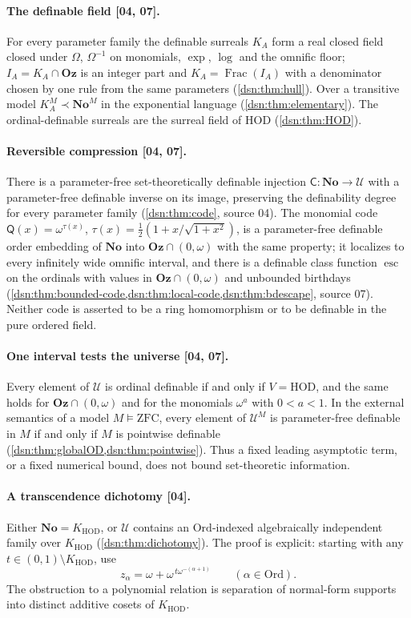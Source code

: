 \documentclass[11pt,a4paper]{article}
\numberwithin{equation}{section}
\theoremstyle{definition}
\theoremstyle{remark}
\newcommand{\No}{\mathbf{No}}
\newcommand{\Oz}{\mathbf{Oz}}
\newcommand{\Ord}{\mathrm{Ord}}
\newcommand{\HOD}{\mathrm{HOD}}
\newcommand{\ZFC}{\mathrm{ZFC}}
\newcommand{\Frac}{\operatorname{Frac}}
\newcommand{\Code}{\mathsf C}
\newcommand{\Mc}{\mathsf Q}
\newcommand{\esc}{\operatorname{esc}}
\newcommand{\Cell}{\mathcal U}
\newcommand{\KH}{K_{\HOD}}
\newcommand{\src}[1]{\textup{\textsf{\small[#1]}}}
\begin{document}
\paragraph{The definable field \src{04, 07}.}
For every parameter family the definable surreals $K_A$ form a real closed
field closed under $\Omega$, $\Omega^{-1}$ on monomials, $\exp$, $\log$
and the omnific floor; $I_A=K_A\cap\Oz$ is an integer part and
$K_A=\Frac(I_A)$ with a denominator chosen by one rule from the same
parameters (\cref{dsn:thm:hull}). Over a transitive model
$K^M_A\prec\No^M$ in the exponential language (\cref{dsn:thm:elementary}).
The ordinal-definable surreals are the surreal field of $\HOD$
(\cref{dsn:thm:HOD}).

\paragraph{Reversible compression \src{04, 07}.}
There is a parameter-free set-theoretically definable injection
$\Code:\No\to\Cell$ with a parameter-free definable inverse on its image,
preserving the definability degree for every parameter family
(\cref{dsn:thm:code}, source 04). The monomial code
$\Mc(x)=\omega^{\tau(x)}$, $\tau(x)=\frac12(1+x/\sqrt{1+x^2})$, is a
parameter-free definable order embedding of $\No$ into
$\Oz\cap(0,\omega)$ with the same property; it localizes to every
infinitely wide omnific interval, and there is a definable class function
$\esc$ on the ordinals with values in $\Oz\cap(0,\omega)$ and unbounded
birthdays (\cref{dsn:thm:bounded-code,dsn:thm:local-code,dsn:thm:bdescape},
source 07). Neither code is asserted to be a ring homomorphism or to be
definable in the pure ordered field.

\paragraph{One interval tests the universe \src{04, 07}.}
Every element of $\Cell$ is ordinal definable if and only if $V=\HOD$, and
the same holds for $\Oz\cap(0,\omega)$ and for the monomials $\omega^a$
with $0<a<1$. In the external semantics of a model $M\models\ZFC$, every
element of $\Cell^M$ is parameter-free definable in $M$ if and only if $M$
is pointwise definable (\cref{dsn:thm:globalOD,dsn:thm:pointwise}). Thus a
fixed leading asymptotic term, or a fixed numerical bound, does not bound
set-theoretic information.

\paragraph{A transcendence dichotomy \src{04}.}
Either $\No=\KH$, or $\Cell$ contains an $\Ord$-indexed algebraically
independent family over $\KH$ (\cref{dsn:thm:dichotomy}). The proof is
explicit: starting with any $t\in(0,1)\setminus\KH$, use
\begin{equation}\label{dsn:eq:introfam}
 z_\alpha=\omega+\omega^{\,t\omega^{-(\alpha+1)}}
 \qquad(\alpha\in\Ord).
\end{equation}
The obstruction to a polynomial relation is separation of normal-form
supports into distinct additive cosets of $\KH$.
\end{document}
